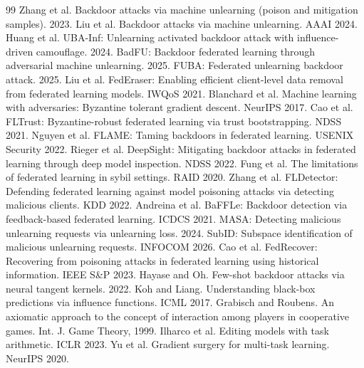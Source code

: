 \documentclass[10pt,a4paper]{article}
\begin{document}
\begin{thebibliography}{99}\small
{} Zhang et al. Backdoor attacks via machine unlearning (poison and mitigation samples). 2023.
 Liu et al. Backdoor attacks via machine unlearning. AAAI 2024.
 Huang et al. UBA-Inf: Unlearning activated backdoor attack with influence-driven camouflage. 2024.
 BadFU: Backdoor federated learning through adversarial machine unlearning. 2025.
 FUBA: Federated unlearning backdoor attack. 2025.
 Liu et al. FedEraser: Enabling efficient client-level data removal from federated learning models. IWQoS 2021.
 Blanchard et al. Machine learning with adversaries: Byzantine tolerant gradient descent. NeurIPS 2017.
 Cao et al. FLTrust: Byzantine-robust federated learning via trust bootstrapping. NDSS 2021.
 Nguyen et al. FLAME: Taming backdoors in federated learning. USENIX Security 2022.
 Rieger et al. DeepSight: Mitigating backdoor attacks in federated learning through deep model inspection. NDSS 2022.
 Fung et al. The limitations of federated learning in sybil settings. RAID 2020.
 Zhang et al. FLDetector: Defending federated learning against model poisoning attacks via detecting malicious clients. KDD 2022.
 Andreina et al. BaFFLe: Backdoor detection via feedback-based federated learning. ICDCS 2021.
 MASA: Detecting malicious unlearning requests via unlearning loss. 2024.
 SubID: Subspace identification of malicious unlearning requests. INFOCOM 2026.
 Cao et al. FedRecover: Recovering from poisoning attacks in federated learning using historical information. IEEE S\&P 2023.
 Hayase and Oh. Few-shot backdoor attacks via neural tangent kernels. 2022.
 Koh and Liang. Understanding black-box predictions via influence functions. ICML 2017.
 Grabisch and Roubens. An axiomatic approach to the concept of interaction among players in cooperative games. Int. J. Game Theory, 1999.
 Ilharco et al. Editing models with task arithmetic. ICLR 2023.
 Yu et al. Gradient surgery for multi-task learning. NeurIPS 2020.
\end{thebibliography}
\end{document}
